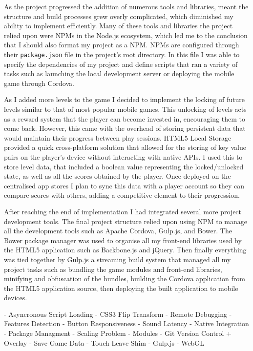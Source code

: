\documentclass[final]{cmpreport}
\begin{document}
As the project progressed the addition of numerous tools and libraries, meant the structure and build processes grew overly complicated, which diminished my ability to implement efficiently. Many of these tools and libraries the project relied upon were NPMs in the Node.js ecosystem, which led me to the conclusion that I should also format my project as a NPM. NPMs are configured through their \texttt{package.json} file in the project's root directory. In this file I was able to specify the dependencies of my project and define scripts that ran a variety of tasks such as launching the local development server or deploying the mobile game through Cordova.

As I added more levels to the game I decided to implement the locking of future levels similar to that of most popular mobile games. This unlocking of levels acts as a reward system that the player can become invested in, encouraging them to come back. However, this came with the overhead of storing persistent data that would maintain their progress between play sessions. HTML5 Local Storage provided a quick cross-platform solution that allowed for the storing of key value pairs on the player's device without interacting with native APIs. I used this to store level data, that included a boolean value representing the locked/unlocked state, as well as all the scores obtained by the player. Once deployed on the centralised app stores I plan to sync this data with a player account so they can compare scores with others, adding a competitive element to their progression.

After reaching the end of implementation I had integrated several more project development tools. The final project structure relied upon using NPM to manage all the development tools such as Apache Cordova, Gulp.js, and Bower. The Bower package manager was used to organise all my front-end libraries used by the HTML5 application such as Backbone.js and jQuery. Then finally everything was tied together by Gulp.js a streaming build system that managed all my project tasks such as bundling the game modules and front-end libraries, minifying and obfuscation of the bundles, building the Cordova application from the HTML5 application source, then deploying the built application to mobile devices.

- Asyncronous Script Loading
- CSS3 Flip Transform
- Remote Debugging
- Features Detection
- Button Responsiveness
- Sound Latency
- Native Integration
- Package Managment
- Scaling Problem
- Modules
- Git Version Control + Overlay
- Save Game Data
- Touch Leave Shim
- Gulp.js
- WebGL
\end{document}
